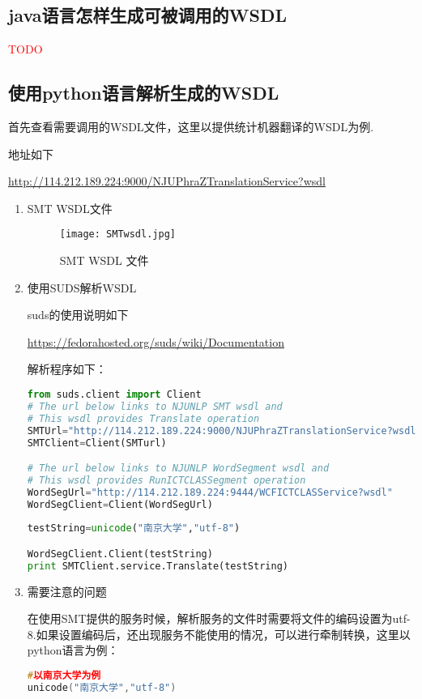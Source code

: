 \subsection{java语言怎样生成可被调用的WSDL}

\textcolor{red}{TODO}

\subsection{使用python语言解析生成的WSDL}

首先查看需要调用的WSDL文件，这里以提供统计机器翻译的WSDL为例.

地址如下

\url{http://114.212.189.224:9000/NJUPhraZTranslationService?wsdl}

\begin{enumerate}
	
\item SMT WSDL文件

\begin{figure}[htpd]
  \centering
  \texttt{[image: SMTwsdl.jpg]}
  \caption{SMT WSDL 文件}
\end{figure}

\item 使用SUDS解析WSDL

suds的使用说明如下

\url{https://fedorahosted.org/suds/wiki/Documentation}

解析程序如下：

\begin{lstlisting}[language=python]
from suds.client import Client
# The url below links to NJUNLP SMT wsdl and
# This wsdl provides Translate operation
SMTUrl="http://114.212.189.224:9000/NJUPhraZTranslationService?wsdl" 
SMTClient=Client(SMTurl)

# The url below links to NJUNLP WordSegment wsdl and 
# This wsdl provides RunICTCLASSegment operation
WordSegUrl="http://114.212.189.224:9444/WCFICTCLASService?wsdl"
WordSegClient=Client(WordSegUrl)
    
testString=unicode("南京大学","utf-8")

WordSegClient.Client(testString)
print SMTClient.service.Translate(testString)
\end{lstlisting}
\item 需要注意的问题

在使用SMT提供的服务时候，解析服务的文件时需要将文件的编码设置为utf-8.如果设置编码后，还出现服务不能使用的情况，可以进行牵制转换，这里以python语言为例：

\begin{lstlisting}[language=c]
#以南京大学为例
unicode("南京大学","utf-8")
\end{lstlisting}
\end{enumerate}


